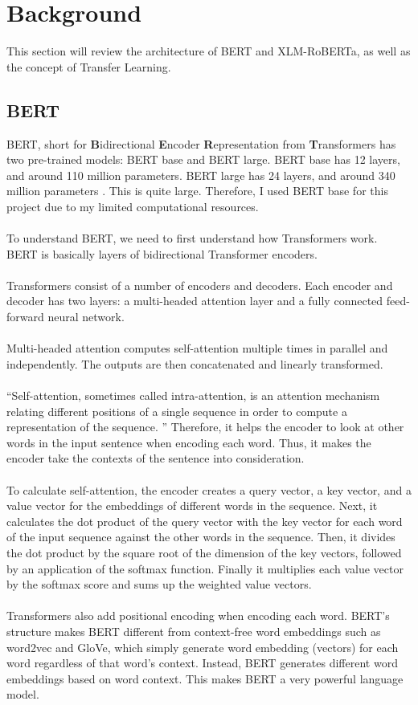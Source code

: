 \documentclass[11pt,a4paper]{article}
\begin{document}
\section{Background}

This section will review the architecture of BERT and XLM-RoBERTa, as well as the concept of Transfer Learning.

\subsection{BERT} 

BERT, short for \textbf{B}idirectional \textbf{E}ncoder \textbf{R}epresentation from \textbf{T}ransformers has two pre-trained models: BERT base and BERT large. BERT base has 12 layers, and around 110 million parameters. BERT large has 24 layers, and around 340 million parameters \cite{BERT}. This is quite large. Therefore, I used BERT base for this project due to my limited computational resources.\\
\\
To understand BERT, we need to first understand how Transformers work. BERT is basically layers of bidirectional Transformer encoders.\\
\\
Transformers consist of a number of encoders and decoders. Each encoder and decoder has two layers: a multi-headed attention layer and a fully connected feed-forward neural network.\\
\\
Multi-headed attention computes self-attention multiple times in parallel and independently. The outputs are then concatenated and linearly transformed.\\
\\
“Self-attention, sometimes called intra-attention, is an attention mechanism relating different positions of a single sequence in order to compute a representation of the sequence. \cite{attention}” Therefore, it helps the encoder to look at other words in the input sentence when encoding each word. Thus, it makes the encoder take the contexts of the sentence into consideration.\\
\\
To calculate self-attention, the encoder creates a query vector, a key vector, and a value vector for the embeddings of different words in the sequence. Next, it calculates the dot product of the query vector with the key vector for each word of the input sequence against the other words in the sequence. Then, it divides the dot product by the square root of the dimension of the key vectors, followed by an application of the softmax function. Finally it multiplies each value vector by the softmax score and sums up the weighted value vectors.\\
\\
Transformers also add positional encoding when encoding each word. BERT’s structure makes BERT different from context-free word embeddings such as word2vec and GloVe, which simply generate word embedding (vectors) for each word regardless of that word's context. Instead, BERT generates different word embeddings based on word context. This makes BERT a very powerful language model.
\end{document}
